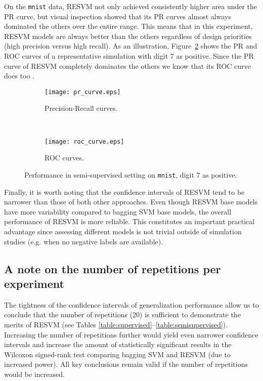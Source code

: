 \documentclass[preprint,elsarticle-num,12pt]{elsarticle}
\begin{document}
On the \texttt{mnist} data, RESVM not only achieved consistently higher area under the PR curve, but visual inspection showed that its PR curves almost always dominated the others over the entire range. This means that in this experiment, RESVM models are always better than the others regardless of design priorities (high precision versus high recall). As an illustration, Figure~\ref{fig:curves} shows the PR and ROC curves of a representative simulation with digit 7 as positive. Since the PR curve of RESVM completely dominates the others we know that its ROC curve does too \citep{Davis:2006:RPR:1143844.1143874}. 

\begin{figure}[!ht]
  \centering
  \begin{subfigure}[b]{0.48\textwidth}
		\texttt{[image: pr\_curve.eps]}
		\caption{Precision-Recall curves.} \label{fig:pr}
  \end{subfigure}
  ~
  \begin{subfigure}[b]{0.48\textwidth}
	  \texttt{[image: roc\_curve.eps]}
		\caption{ROC curves.}
  \end{subfigure}
  \caption{Performance in semi-supervised setting on \texttt{mnist}, digit $7$ as positive.} 
  \label{fig:curves}
\end{figure}

Finally, it is worth noting that the confidence intervals of RESVM tend to be narrower than those of both other approaches. Even though RESVM base models have more variability compared to bagging SVM base models, the overall performance of RESVM is more reliable. This constitutes an important practical advantage since assessing different models is not trivial outside of simulation studies (e.g. when no negative labels are available). 


\subsection{A note on the number of repetitions per experiment}
The tightness of the confidence intervals of generalization performance allow us to conclude that the number of repetitions (20) is sufficient to demonstrate the merits of RESVM (see Tables \ref{table:supervised}--\ref{table:semisupervised}). Increasing the number of repetitions further would yield even narrower confidence intervals and increase the amount of statistically significant results in the Wilcoxon signed-rank test comparing bagging SVM and RESVM (due to increased power). All key conclusions remain valid if the number of repetitions would be increased. 
\end{document}

